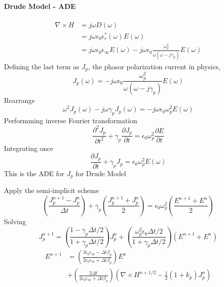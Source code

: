 \paragraph{{\msjh Drude Model - ADE}}
\begin{equation}
  \begin{split}
    \nabla \times H & = j\omega D(\omega)\\
    & = j\omega \epsilon_0\epsilon_r^*(\omega)E(\omega)\\
    & = j\omega \epsilon_0 \epsilon_{\infty} E(\omega) - j\omega \epsilon_0\frac{\omega_p^2}{\omega(\omega-j\gamma_p)}E(\omega)
  \end{split}
\end{equation}
Defining the last term as $J_p$, the phasor polarization current in physics,
\begin{equation}
  J_p(\omega) = -j\omega\epsilon_0\frac{\omega_p^2}{\omega(\omega-j\gamma_p)}E(\omega)
\end{equation}
Rearrange
\begin{equation}
  \omega^2J_p(\omega) - j\omega\gamma_pJ_p(\omega) = -j\omega\epsilon_0\omega_p^2 E(\omega)
\end{equation}
Performming inverse Fourier transformation
\begin{equation}
  \frac{\partial^2 J_p}{\partial t^2} + \gamma_p \frac{\partial J_p}{\partial t} = \epsilon_0\omega_p^2\frac{\partial E}{\partial t}
\end{equation}
Integrating once
\begin{equation}
  \frac{\partial J_p}{\partial t} + \gamma_p J_p = \epsilon_0 \omega_p^2 E(\omega)
\end{equation}
This is the ADE for $J_p$ for Drude Model

Apply the semi-implicit scheme
\begin{equation}
  \left(\frac{J_p^{n+1} - J_p^n}{\Delta t}\right) + \gamma_{p}\left(\frac{J_p^{n+1} + J_p^n}{2}\right) = \epsilon_0\omega_p^2\left(\frac{E^{n+1} + E^n}{2}\right)
\end{equation}
Solving
\begin{equation}
  J_p^{n+1} = \left(\frac{1-\gamma_p\Delta t /2}{1+\gamma_p\Delta t /2}\right)J_p^n + \left(\frac{\omega_p^2\epsilon_0\Delta t /2}{1+\gamma_p\Delta t /2}\right)\left(E^{n+1}+E^n\right)
\end{equation}
\begin{equation}
  \begin{split}
    E^{n+1} & = \left(\frac{2\epsilon_0\epsilon_{\infty} - \Delta t \beta_p}{2\epsilon_0\epsilon_{\infty} + \Delta t \beta_p}\right)E^n \\
    & + \left(\frac{2\Delta t}{2\epsilon_0\epsilon_{\infty} + \Delta t \beta_p}\right)\left(\nabla\times H^{n+1/2} - \frac{1}{2}(1+k_p)J_p^n\right)
  \end{split}
\end{equation}




